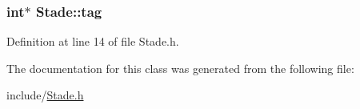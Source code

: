 \hypertarget{class_stade_ad941a9ee2d5283e933be7dc4bb6096fc}{
\subsubsection[{tag}]{\setlength{\rightskip}{0pt plus 5cm}int$\ast$ Stade\+::tag}}\label{class_stade_ad941a9ee2d5283e933be7dc4bb6096fc}


Definition at line 14 of file Stade.\+h.



The documentation for this class was generated from the following file\+:\begin{DoxyCompactItemize}
\item 
include/\hyperlink{_stade_8h}{Stade.\+h}\end{DoxyCompactItemize}
